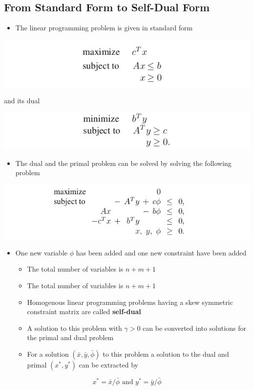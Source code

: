 \documentclass[11pt]{article}
\begin{document}
\subsection{From Standard Form to Self-Dual Form}
\label{sec:orgd3445c6}
\begin{itemize}
\item The linear programming problem is given in standard form
\end{itemize}
\begin{center}
\includegraphics[width=.9\linewidth]{The Homogeneous Self-Dual Method/screenshot_2019-03-11_17-36-41.png}
\end{center}
and its dual
\begin{center}
\includegraphics[width=.9\linewidth]{The Homogeneous Self-Dual Method/screenshot_2019-03-11_17-36-52.png}
\end{center} 
\begin{itemize}
\item The dual and the primal problem can be solved by solving the following problem
\end{itemize}
\begin{center}
\includegraphics[width=.9\linewidth]{The Homogeneous Self-Dual Method/screenshot_2019-03-11_17-37-29.png}
\end{center}
\begin{itemize}
\item One new variable \(\phi\) has been added and one new constraint have been added
\begin{itemize}
\item The total number of variables is \(n+m+1\)
\item The total number of variables is \(n+m+1\)
\item Homogenous linear programming problems having a skew symmetric constraint matrix are called \textbf{self-dual}
\item A solution to this problem with \(\gamma > 0\) can be converted into solutions for the primal and dual problem
\item For a solution \((\bar x, \bar y, \bar \phi)\) to this problem a solution to the dual and primal \((x^*,y^*)\) can be extracted by
\end{itemize}
\end{itemize}
\begin{equation}
  x^* = \bar x / \bar \phi \text{ and } y^* = \bar y / \bar \phi
\end{equation}
\end{document}
